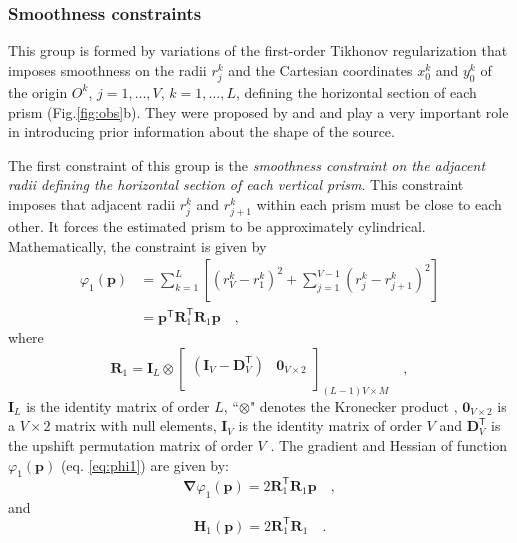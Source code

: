 \subsubsection{Smoothness constraints}

This group is formed by variations of the first-order Tikhonov regularization \cite[][ p. 103]{aster-etal2019} that imposes smoothness on the radii $r_{j}^{k}$ and the Cartesian coordinates $x_{0}^{k}$ and $y_{0}^{k}$ of the origin $O^{k}$, $j = 1, \dots, V$, $k = 1, \dots, L$, defining the horizontal section of each prism (Fig.\ref{fig:obs}b).
They were proposed by \cite{oliveirajr-etal2011} and \cite{oliveirajr-barbosa2013} and play a very important role in introducing prior information about the shape of the source. 

The first constraint of this group is the \textit{smoothness constraint on the adjacent radii defining the horizontal section of each vertical prism}. This constraint imposes that adjacent radii $r_{j}^{k}$ and $r_{j+1}^{k}$ within each prism must be close to each other. It forces the estimated prism to be approximately cylindrical. Mathematically, the constraint is given by \begin{equation}\label{eq:phi1}
\begin{split}
\varphi_{1}(\mathbf{p}) &= \sum\limits^{L}_{k=1}\left[\left(r^{k}_{V}-r^{k}_{1}\right)^2 + \sum\limits^{V-1}_{j=1}\left(r^{k}_{j}-r^{k}_{j+1}\right)^2\right]\\
 &= \mathbf{p}^{\mathsf{T}} \mathbf{R}^{\mathsf{T}}_{1}\mathbf{R}_{1} \mathbf{p} \quad ,
\end{split}
\end{equation}
where
\begin{equation}
\mathbf{R}_{1} = 
\mathbf{I}_{L} \otimes 
\begin{bmatrix}
\left( \mathbf{I}_{V} - \mathbf{D}_{V}^\mathsf{T} \right) & \mathbf{0}_{V \times 2} \\
\end{bmatrix}_{(L-1)V \times M} \quad ,
\label{eq:S1-matrix}
\end{equation}
$\mathbf{I}_{L}$ is the identity matrix of order $L$, ``$\otimes$" denotes the Kronecker product \cite[][ p. 243]{horn_johnson1991}, $\mathbf{0}_{V \times 2}$ is a $V \times 2$ matrix with null elements, 
$\mathbf{I}_{V}$ is the identity matrix of order $V$ and $\mathbf{D}_{V}^\mathsf{T}$ is the upshift permutation matrix of order $V$ \cite[][ p. 20]{golub-vanloan2013}. The gradient and Hessian of function $\varphi_{1}(\mathbf{p})$ (eq. \ref{eq:phi1}) are given by:
\begin{equation}\label{eq:phi1_grad}
\boldsymbol{\nabla}\varphi_{1}(\mathbf{p}) = 2 \mathbf{R}^\mathsf{T}_{1}\mathbf{R}_{1}\mathbf{p} \quad ,
\end{equation}
and
\begin{equation}\label{eq:phi1_hessian}
\mathbf{H}_{1}(\mathbf{p}) = 2\mathbf{R}^\mathsf{T}_{1}\mathbf{R}_{1} \quad .
\end{equation}

